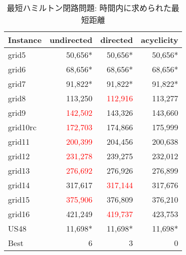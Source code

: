 \begin{table}[htbp]
  \caption{最短ハミルトン閉路問題: 時間内に求められた最短距離}
  \label{min_table_tr}
  \centering
  \begin{tabular}{|l|rrr|}
    \hline
    Instance & \textsf{undirected} & \textsf{directed} & \textsf{acyclicity} \\
    \hline
    grid5&50,656*&50,656*&50,656* \\
    grid6&68,656*&68,656*&68,656* \\
    grid7&91,822*&91,822*&91,822* \\
    grid8&113,250&\textcolor{red}{112,916}&113,277 \\
    grid9&\textcolor{red}{142,502}&143,326&143,660 \\
    grid10rc&\textcolor{red}{172,703}&174,866&175,999 \\
    grid11&\textcolor{red}{200,399}&204,456&200,638 \\
    grid12&\textcolor{red}{231,278}&239,275&232,012 \\
    grid13&\textcolor{red}{276,692}&276,926&276,899 \\
    grid14&317,617&\textcolor{red}{317,144}&317,676 \\
    grid15&\textcolor{red}{375,906}&376,809&376,210 \\
    grid16&421,249&\textcolor{red}{419,737}&423,753 \\
    US48&11,698*&11,698*&11,698* \\
    \hline
    Best & 6 & 3 & 0 \\
    \hline
  \end{tabular}
\end{table}
